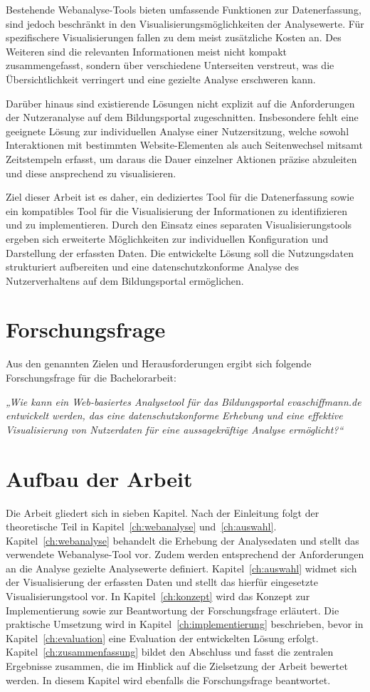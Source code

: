 Bestehende Webanalyse-Tools bieten umfassende Funktionen zur Datenerfassung, sind jedoch beschränkt in den Visualisierungsmöglichkeiten der Analysewerte. Für spezifischere Visualisierungen fallen zu dem meist zusätzliche Kosten an. Des Weiteren sind die relevanten Informationen meist nicht kompakt zusammengefasst, sondern über verschiedene Unterseiten verstreut, was die Übersichtlichkeit verringert und eine gezielte Analyse erschweren kann.

Darüber hinaus sind existierende Lösungen nicht explizit auf die Anforderungen der Nutzeranalyse auf dem Bildungsportal zugeschnitten. Insbesondere fehlt eine geeignete Lösung zur individuellen Analyse einer Nutzersitzung, welche sowohl Interaktionen mit bestimmten Website-Elementen als auch Seitenwechsel mitsamt Zeitstempeln erfasst, um daraus die Dauer einzelner Aktionen präzise abzuleiten und diese ansprechend zu visualisieren.

Ziel dieser Arbeit ist es daher, ein dediziertes Tool für die Datenerfassung sowie ein kompatibles Tool für die Visualisierung der Informationen zu identifizieren und zu implementieren. Durch den Einsatz eines separaten Visualisierungstools ergeben sich erweiterte Möglichkeiten zur individuellen Konfiguration und Darstellung der erfassten Daten. Die entwickelte Lösung soll die Nutzungsdaten strukturiert aufbereiten und eine datenschutzkonforme Analyse des Nutzerverhaltens auf dem Bildungsportal ermöglichen.

\section{Forschungsfrage}
\label{sec:forschungsfrage}
Aus den genannten Zielen und Herausforderungen ergibt sich folgende Forschungsfrage für die Bachelorarbeit:

\textit{„Wie kann ein Web-basiertes Analysetool für das Bildungsportal \textit{evaschiffmann.de} entwickelt werden, das eine datenschutzkonforme Erhebung und eine effektive Visualisierung von Nutzerdaten für eine aussagekräftige Analyse ermöglicht?“}

\section{Aufbau der Arbeit}
\label{sec:aufbau}
Die Arbeit gliedert sich in sieben Kapitel. Nach der Einleitung folgt der theoretische Teil in Kapitel~\ref{ch:webanalyse} und~\ref{ch:auswahl}. Kapitel~\ref{ch:webanalyse} behandelt die Erhebung der Analysedaten und stellt das verwendete Webanalyse-Tool vor. Zudem werden entsprechend der Anforderungen an die Analyse gezielte Analysewerte definiert. Kapitel~\ref{ch:auswahl} widmet sich der Visualisierung der erfassten Daten und stellt das hierfür eingesetzte Visualisierungstool vor. In Kapitel~\ref{ch:konzept} wird das Konzept zur Implementierung sowie zur Beantwortung der Forschungsfrage erläutert. Die praktische Umsetzung wird in Kapitel~\ref{ch:implementierung} beschrieben, bevor in Kapitel~\ref{ch:evaluation} eine Evaluation der entwickelten Lösung erfolgt. Kapitel~\ref{ch:zusammenfassung} bildet den Abschluss und fasst die zentralen Ergebnisse zusammen, die im Hinblick auf die Zielsetzung der Arbeit bewertet werden. In diesem Kapitel wird ebenfalls die Forschungsfrage beantwortet.
